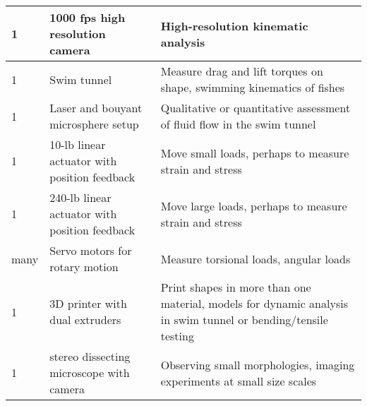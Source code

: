 \documentclass [12 pt]{article}
\begin{document}
\begin{longtable}{p{2.5cm}|p{4.5cm}|p{5cm}}
 1 		&1000 fps high resolution camera				&	High-resolution kinematic analysis\\ \hline
  1		& Swim tunnel								& 	Measure drag and lift torques on shape, swimming kinematics of fishes\\\hline
    1		& Laser and bouyant microsphere setup			& 	Qualitative or quantitative assessment of fluid flow in the swim tunnel \\\hline
  1		& 10-lb linear actuator with position feedback		& 	Move small loads, perhaps to measure strain and stress\\ \hline
  1		& 240-lb linear actuator with position feedback		& 	Move large loads, perhaps to measure strain and stress\\ \hline
   many		& Servo motors for rotary motion		& 	Measure torsional loads, angular loads\\ \hline
     1		& 3D printer with dual extruders		& 	Print shapes in more than one material, models for dynamic analysis in swim tunnel or bending/tensile testing\\ \hline
          1		& stereo dissecting microscope with camera		& 	Observing small morphologies, imaging experiments at small size scales\\ \hline
  
  



\end{longtable}
\end{document}
